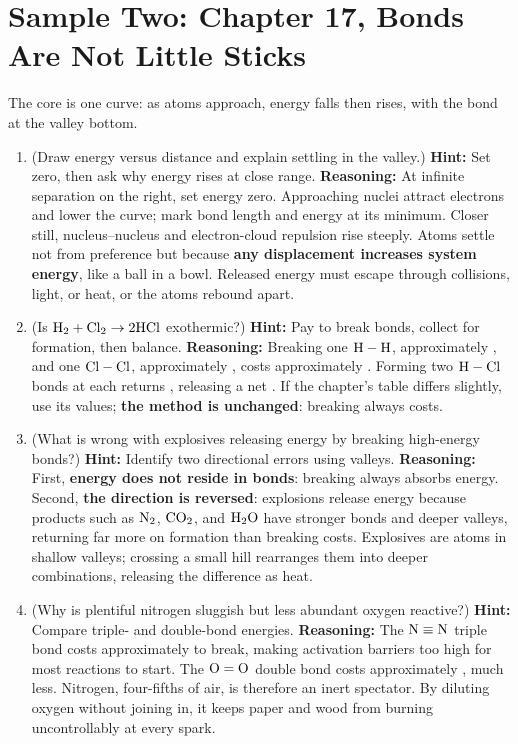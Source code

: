 \section{Sample Two: Chapter 17, Bonds Are Not Little Sticks}

The core is one curve: as atoms approach, energy falls then rises, with the bond at the valley bottom.

\begin{enumerate}[itemsep=3pt]
\item (Draw energy versus distance and explain settling in the valley.) \textbf{Hint:} Set zero, then ask why energy rises at close range. \textbf{Reasoning:} At infinite separation on the right, set energy zero. Approaching nuclei attract electrons and lower the curve; mark bond length and energy at its minimum. Closer still, nucleus--nucleus and electron-cloud repulsion rise steeply. Atoms settle not from preference but because \textbf{any displacement increases system energy}, like a ball in a bowl. Released energy must escape through collisions, light, or heat, or the atoms rebound apart.
\item (Is $\mathrm{H_2} + \mathrm{Cl_2} \rightarrow \mathrm{2HCl}$ exothermic?) \textbf{Hint:} Pay to break bonds, collect for formation, then balance. \textbf{Reasoning:} Breaking one $\mathrm{H-H}$, approximately , and one $\mathrm{Cl-Cl}$, approximately , costs approximately . Forming two $\mathrm{H-Cl}$ bonds at  each returns , releasing a net . If the chapter's table differs slightly, use its values; \textbf{the method is unchanged}: breaking always costs.
\item (What is wrong with explosives releasing energy by breaking high-energy bonds?) \textbf{Hint:} Identify two directional errors using valleys. \textbf{Reasoning:} First, \textbf{energy does not reside in bonds}: breaking always absorbs energy. Second, \textbf{the direction is reversed}: explosions release energy because products such as $\mathrm{N_2}$, $\mathrm{CO_2}$, and $\mathrm{H_2O}$ have stronger bonds and deeper valleys, returning far more on formation than breaking costs. Explosives are atoms in shallow valleys; crossing a small hill rearranges them into deeper combinations, releasing the difference as heat.
\item (Why is plentiful nitrogen sluggish but less abundant oxygen reactive?) \textbf{Hint:} Compare triple- and double-bond energies. \textbf{Reasoning:} The $\mathrm{N \equiv N}$ triple bond costs approximately  to break, making activation barriers too high for most reactions to start. The $\mathrm{O=O}$ double bond costs approximately , much less. Nitrogen, four-fifths of air, is therefore an inert spectator. By diluting oxygen without joining in, it keeps paper and wood from burning uncontrollably at every spark.

\end{enumerate}
